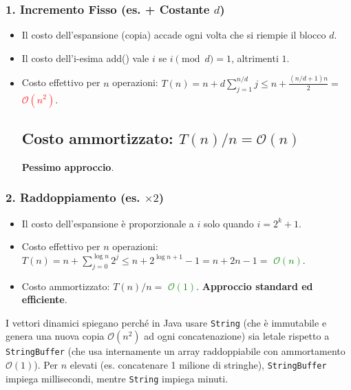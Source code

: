 \documentclass[12pt, a4paper]{article}
\begin{document}
\subsubsection{1. Incremento Fisso (es. + Costante \texorpdfstring{$d$}{d})}
\begin{itemize}
\item Il costo dell'espansione (copia) accade ogni volta che si riempie il blocco $d$.
\item Il costo dell'i-esima add() vale $i$ se $i \pmod d = 1$, altrimenti $1$.
\item Costo effettivo per $n$ operazioni: $T(n) = n + d \sum_{j=1}^{n/d} j \le n + \frac{(n/d+1)n}{2} =$ \textcolor{red}{$\mathcal{O}(n^2)$}.\subsection{Costo ammortizzato: \texorpdfstring{$T(n)/n = \mathcal{O}(n)$}{T(n)/n = O(n)}}
\textbf{Pessimo approccio}.
\end{itemize}

\subsubsection{2. Raddoppiamento (es. \texorpdfstring{$\times 2$}{x2})}
\begin{itemize}
\item Il costo dell'espansione è proporzionale a $i$ solo quando $i = 2^k + 1$.
\item Costo effettivo per $n$ operazioni: $T(n) = n + \sum_{j=0}^{\log n} 2^j \le n + 2^{\log n + 1} - 1 = n + 2n - 1 =$ \textcolor{green}{$\mathcal{O}(n)$}.
\item Costo ammortizzato: $T(n)/n =$ \textcolor{green}{$\mathcal{O}(1)$}. \textbf{Approccio standard ed efficiente}.
\end{itemize}

\begin{tcolorbox}[colback=lightergray!10, colframe=tocsec, title=\textbf{Reality Check sulle Stringhe (Java/Python)}]
I vettori dinamici spiegano perché in Java usare \texttt{String} (che è immutabile e genera una nuova copia $\mathcal{O}(n^2)$ ad ogni concatenazione) sia letale rispetto a \texttt{StringBuffer} (che usa internamente un array raddoppiabile con ammortamento $\mathcal{O}(1)$). Per $n$ elevati (es. concatenare 1 milione di stringhe), \texttt{StringBuffer} impiega millisecondi, mentre \texttt{String} impiega minuti.
\end{tcolorbox}
\end{document}
